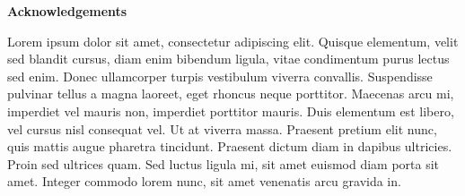 \thispagestyle{empty}

\begin{center}
\vspace*{4cm}
\textbf{Acknowledgements}
\end{center}

Lorem ipsum dolor sit amet, consectetur adipiscing elit. Quisque elementum, velit sed blandit cursus, diam enim bibendum ligula, vitae condimentum purus lectus sed enim. Donec ullamcorper turpis vestibulum viverra convallis. Suspendisse pulvinar tellus a magna laoreet, eget rhoncus neque porttitor. Maecenas arcu mi, imperdiet vel mauris non, imperdiet porttitor mauris. Duis elementum est libero, vel cursus nisl consequat vel. Ut at viverra massa. Praesent pretium elit nunc, quis mattis augue pharetra tincidunt. Praesent dictum diam in dapibus ultricies. Proin sed ultrices quam. Sed luctus ligula mi, sit amet euismod diam porta sit amet. Integer commodo lorem nunc, sit amet venenatis arcu gravida in.
\newpage
\afterpage{\blankpage}